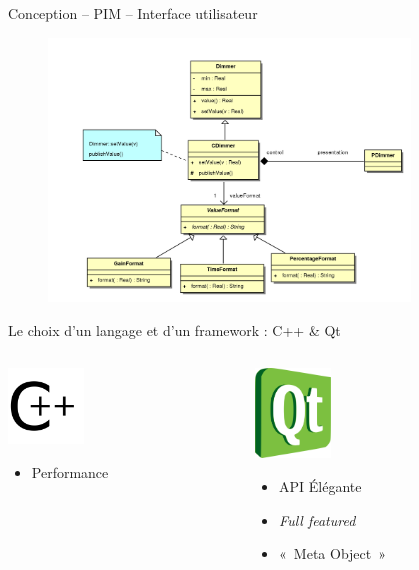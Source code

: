 \documentclass[frenchb]{beamer}
\begin{document}
\begin{frame}{Conception -- PIM -- Interface utilisateur}
    \begin{figure}
        \includegraphics[height=7cm]{../img/ps/pacdimmer-pim.pdf}
    \end{figure}
\end{frame}

\begin{frame}{Le choix d'un langage et d'un framework : C++ \& Qt}
    \begin{columns}
        \begin{column}[l]{6cm}
            \begin{center}
                \includegraphics[width=2cm]{../img/ps/C_plus_plus.pdf}
            \end{center}
            \begin{itemize}
                \item Performance
            \end{itemize}
        \end{column}
        \pause
        \begin{column}[r]{6cm}
            \begin{center}
                \includegraphics[width=2cm]{../img/ps/Qt.pdf}
            \end{center}
            \begin{itemize}
                \item API Élégante
                \item \textit{Full featured}
                \item «~Meta Object~»
            \end{itemize}
        \end{column}
    \end{columns}
\end{frame}
\end{document}
